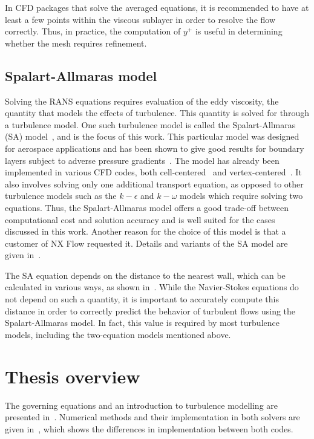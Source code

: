 In CFD packages that solve the averaged equations, it is recommended to have at least a few points within the viscous sublayer in order to resolve the flow correctly. Thus, in practice, the computation of $y^+$ is useful in determining whether the mesh requires refinement.
%
%
\subsection{Spalart-Allmaras model}
\label{sec:introsa}
%
%
Solving the RANS equations requires evaluation of the eddy viscosity, the quantity that models the effects of turbulence. This quantity is solved for through a turbulence model. One such turbulence model is called the Spalart-Allmaras (SA) model~\cite{spalart1994one}, and is the focus of this work. This particular model was designed for aerospace applications and has been shown to give good results for boundary layers subject to adverse pressure gradients~\cite{spalart1994one}. The model has already been implemented in various CFD codes, both cell-centered~\cite{bardina1997turbulence,seror2005implementation,trompoukis2011cuda,saxena2002implementation} and vertex-centered~\cite{anderson1994implicit,gerhold1997calculation,wang2010comparison}. It also involves solving only one additional transport equation, as opposed to other turbulence models such as the $k-\epsilon$ and $k-\omega$ models which require solving two equations. Thus, the Spalart-Allmaras model offers a good trade-off between computational cost and solution accuracy and is well suited for the cases discussed in this work. Another reason for the choice of this model is that a customer of NX Flow requested it. Details and variants of the SA model are given in~.

The SA equation depends on the distance to the nearest wall, which can be calculated in various ways, as shown in~. While the Navier-Stokes equations do not depend on such a quantity, it is important to accurately compute this distance in order to correctly predict the behavior of turbulent flows using the Spalart-Allmaras model. In fact, this value is required by most turbulence models, including the two-equation models mentioned above.

\section{Thesis overview}
The governing equations and an introduction to turbulence modelling are presented in~. Numerical methods and their implementation in both solvers are given in~, which shows the differences in implementation between both codes.

